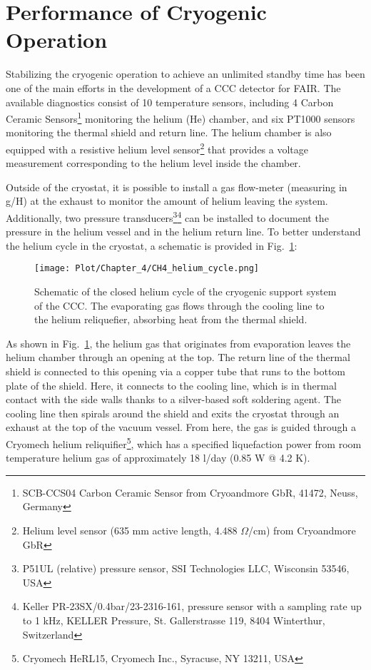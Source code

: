 \documentclass[12pt,a4paper]{report}
\begin{document}
		\section{Performance of Cryogenic Operation}
        Stabilizing the cryogenic operation to achieve an unlimited standby time has been one of the main efforts in the development of a CCC detector for FAIR. The available diagnostics consist of 10 temperature sensors, including 4 Carbon Ceramic Sensors\footnote{SCB-CCS04 Carbon Ceramic Sensor from Cryoandmore GbR, 41472, Neuss, Germany} monitoring the helium (He) chamber, and six PT1000 sensors monitoring the thermal shield and return line. The helium chamber is also equipped with a resistive helium level sensor\footnote{Helium level sensor (635 mm active length, 4.488 $\Omega$/cm) from Cryoandmore GbR} that provides a voltage measurement corresponding to the helium level inside the chamber. 
        
        Outside of the cryostat, it is possible to install a gas flow-meter (measuring in g/H) at the exhaust to monitor the amount of helium leaving the system. Additionally, two pressure transducers\footnote{P51UL (relative) pressure sensor, SSI Technologies LLC, Wisconsin 53546, USA}\footnote{Keller PR-23SX/0.4bar/23-2316-161, pressure sensor with a sampling rate up to 1 kHz, KELLER Pressure, St. Gallerstrasse 119, 8404 Winterthur, Switzerland} can be installed to document the pressure in the helium vessel and in the helium return line. To better understand the helium cycle in the cryostat, a schematic is provided in Fig.~\ref{CH4_cryocycle}:
        
        \begin{figure}[H]
        	\centering
        	\texttt{[image: Plot/Chapter\_4/CH4\_helium\_cycle.png]}
        	\caption{\small{Schematic of the closed helium cycle of the cryogenic support system of the CCC. The evaporating gas flows through the cooling line to the helium reliquefier, absorbing heat from the thermal shield.}}
        	\label{CH4_cryocycle}
        \end{figure}
        
        As shown in Fig.~\ref{CH4_cryocycle}, the helium gas that originates from evaporation leaves the helium chamber through an opening at the top. The return line of the thermal shield is connected to this opening via a copper tube that runs to the bottom plate of the shield. Here, it connects to the cooling line, which is in thermal contact with the side walls thanks to a silver-based soft soldering agent. The cooling line then spirals around the shield and exits the cryostat through an exhaust at the top of the vacuum vessel. From here, the gas is guided through a Cryomech helium reliquifier\footnote{Cryomech HeRL15, Cryomech Inc., Syracuse, NY 13211, USA}, which has a specified liquefaction power from room temperature helium gas of approximately 18 l/day (0.85 W @ 4.2 K). 
        
\end{document}
